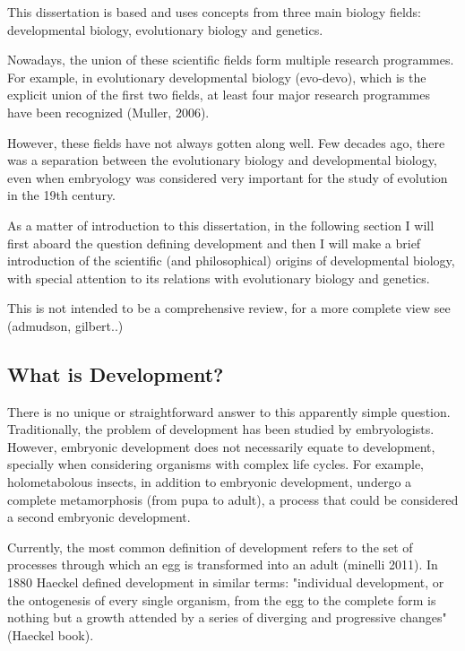 
This dissertation is based and uses concepts from three main biology fields: 
developmental biology, evolutionary biology and genetics.

%
Nowadays, the union of these scientific fields form multiple research programmes. 
For example, in evolutionary developmental biology (evo-devo), which is the explicit union of the first two fields, at least four major research programmes have been recognized (Muller, 2006).

However, these fields have not always gotten along well. 
Few decades ago, there was a separation between the evolutionary biology and developmental biology, even when embryology was considered very important for the study of evolution in the 19th century.

As a matter of introduction to this dissertation, in the following section I will first aboard the question defining development and then I will make a brief introduction of the scientific (and philosophical) origins of developmental biology, with special attention to its relations with evolutionary biology and genetics. 

This is not intended to be a comprehensive review, for a more complete view see (admudson, gilbert..)



\subsection{What is Development?}

There is no unique or straightforward answer to this apparently simple question.
Traditionally, the problem of development has been studied by embryologists. However, embryonic development does not necessarily equate to development,
specially when considering organisms with complex life cycles. For example, holometabolous insects, in addition to embryonic development, undergo a complete metamorphosis (from pupa to adult), a process that could be considered a second embryonic development.

Currently, the most common definition of development refers to the set of processes through which an egg is transformed into an adult (minelli 2011).
In 1880 Haeckel defined development in similar terms: "individual development, or the ontogenesis of every single organism, from the egg to the complete form is nothing but a growth attended by a series of diverging and progressive changes" (Haeckel book).

